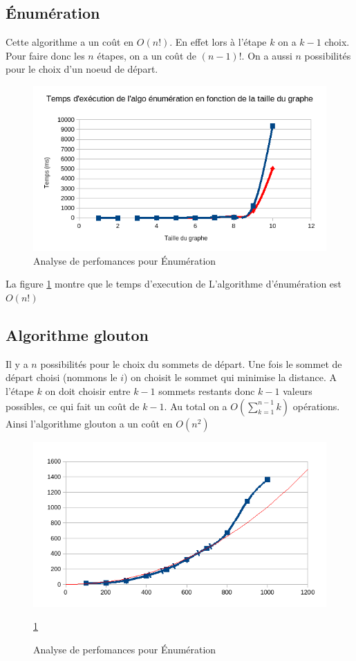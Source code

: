 \documentclass[11pt]{article} \usepackage[top=2cm, bottom=2cm, left=2cm, right=2cm]{geometry}
\begin{document}
\subsection*{\'Enumération}
Cette algorithme a un coût en $O(n!)$. En effet lors à l'étape $k$ on a $k-1$ choix. Pour faire donc les $n$ étapes, on
a un coût de $(n-1)!$. On  a aussi $n$ possibilités pour le choix d'un noeud de départ.
  \begin{figure}[ht]
\begin{center}
  
  \includegraphics[scale=0.8]{images/exec_enum.png}
  \caption{Analyse de perfomances pour \'Enumération}
  \label{enum}
\end{center}
\end{figure}
La figure \ref{enum} montre que le temps d'execution de L'algorithme d'énumération est $O(n!)$
\subsection*{Algorithme glouton}
Il y a $n$ possibilités pour le choix du sommets de départ. Une fois le sommet de départ choisi (nommons le $i$) on choisit le sommet qui
minimise la distance. A l'étape $k$ on doit choisir entre $k-1$ sommets restants donc $k-1$ valeurs possibles, ce qui fait un coût de $k-1$. Au
total on a $O(\sum_{k=1}^{n-1} k)$ opérations. 
Ainsi l'algorithme glouton a un coût en $O(n^2)$
  \begin{figure}[ht]
\begin{center}
  
  \includegraphics[scale=0.8]{images/exec_glouton.png}
  \caption{Analyse de perfomances pour \'Enumération}
  \ref{enum}
\end{center}
\end{figure}
\end{document}
